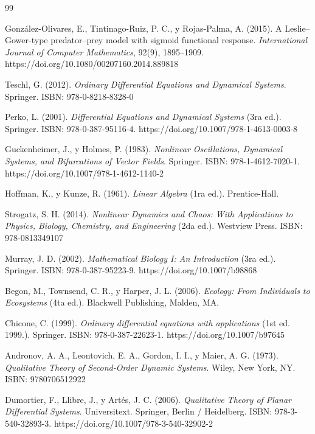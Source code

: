 \documentclass[12pt,letterpaper,oneside]{book}
\theoremstyle{definition}
\theoremstyle{remark}
\begin{document}
	\begin{thebibliography}{99}
		
		González-Olivares, E., Tintinago-Ruiz, P. C., y Rojas-Palma, A. (2015). A Leslie–Gower-type predator–prey model with sigmoid functional response. \textit{International Journal of Computer Mathematics}, 92(9), 1895--1909. https://doi.org/10.1080/00207160.2014.889818
		
		Teschl, G. (2012). \textit{Ordinary Differential Equations and Dynamical Systems}. Springer. ISBN: 978-0-8218-8328-0
		
		Perko, L. (2001). \textit{Differential Equations and Dynamical Systems} (3ra ed.). Springer. ISBN: 978-0-387-95116-4. https://doi.org/10.1007/978-1-4613-0003-8
		
		Guckenheimer, J., y Holmes, P. (1983). \textit{Nonlinear Oscillations, Dynamical Systems, and Bifurcations of Vector Fields}. Springer. ISBN: 978-1-4612-7020-1. https://doi.org/10.1007/978-1-4612-1140-2
		
		Hoffman, K., y Kunze, R. (1961). \textit{Linear Algebra} (1ra ed.). Prentice-Hall.
		
		Strogatz, S. H. (2014). \textit{Nonlinear Dynamics and Chaos: With Applications to Physics, Biology, Chemistry, and Engineering} (2da ed.). Westview Press. ISBN: 978-0813349107
		
		Murray, J. D. (2002). \textit{Mathematical Biology I: An Introduction} (3ra ed.). Springer. ISBN: 978-0-387-95223-9. https://doi.org/10.1007/b98868
		
		Begon, M., Townsend, C. R., y Harper, J. L. (2006). \textit{Ecology: From Individuals to Ecosystems} (4ta ed.). Blackwell Publishing, Malden, MA.
		
		Chicone, C. (1999). \textit{Ordinary differential equations with applications} (1st ed. 1999.). Springer. ISBN: 978-0-387-22623-1. https://doi.org/10.1007/b97645
		
		Andronov, A. A., Leontovich, E. A., Gordon, I. I., y Maier, A. G. (1973). \textit{Qualitative Theory of Second-Order Dynamic Systems}. Wiley, New York, NY. ISBN: 9780706512922
		
		Dumortier, F., Llibre, J., y Artés, J. C. (2006). \textit{Qualitative Theory of Planar Differential Systems}. Universitext. Springer, Berlin / Heidelberg. ISBN: 978-3-540-32893-3. https://doi.org/10.1007/978-3-540-32902-2
		
	\end{thebibliography}
	
\end{document}
